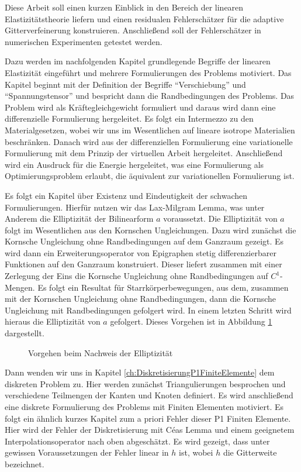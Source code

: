 \documentclass{scrartcl}
\begin{document}
Diese Arbeit soll einen kurzen Einblick in den Bereich der linearen Elastizitätstheorie liefern und einen residualen Fehlerschätzer für die adaptive Gitterverfeinerung konstruieren. Anschließend soll der Fehlerschätzer in numerischen Experimenten getestet werden.

Dazu werden im nachfolgenden Kapitel grundlegende Begriffe der linearen Elastizität eingeführt und mehrere Formulierungen des Problems motiviert. Das Kapitel beginnt mit der Definition der Begriffe "`Verschiebung"' und "`Spannungstensor"' und bespricht dann die Randbedingungen des Problems. Das Problem wird als Kräftegleichgewicht formuliert und daraus wird dann eine differenzielle Formulierung hergeleitet. Es folgt ein Intermezzo zu den Materialgesetzen, wobei wir uns im Wesentlichen auf lineare isotrope Materialien beschränken. Danach wird aus der differenziellen Formulierung eine variationelle Formulierung mit dem Prinzip der virtuellen Arbeit hergeleitet. Anschließend wird ein Ausdruck für die Energie hergeleitet, was eine Formulierung als Optimierungsproblem erlaubt, die äquivalent zur variationellen Formulierung ist.

Es folgt ein Kapitel über Existenz und Eindeutigkeit der schwachen Formulierungen. Hierfür nutzen wir das Lax-Milgram Lemma, was unter Anderem die Elliptizität der Bilinearform $a$ voraussetzt. Die Elliptizität von $a$ folgt im Wesentlichen aus den Kornschen Ungleichungen. Dazu wird zunächst die Kornsche Ungleichung ohne Randbedingungen auf dem Ganzraum gezeigt. Es wird dann ein Erweiterungsoperator von Epigraphen stetig differenzierbarer Funktionen auf den Ganzraum konstruiert. Dieser liefert zusammen mit einer Zerlegung der Eins die Kornsche Ungleichung ohne Randbedingungen auf $C^1$-Mengen. Es folgt ein Resultat für Starrkörperbewegungen, aus dem, zusammen mit der Kornschen Ungleichung ohne Randbedingungen, dann die Kornsche Ungleichung mit Randbedingungen gefolgert wird. In einem letzten Schritt wird hieraus die Elliptizität von $a$ gefolgert. Dieses Vorgehen ist in Abbildung \ref{dr:KornFlowchart} dargestellt.

\begin{figure}[h]
\centering
\vspace*{0.3cm}
\scalebox{0.7}{

}
\caption{Vorgehen beim Nachweis der Elliptizität}
\label{dr:KornFlowchart}
\end{figure}

Dann wenden wir uns in Kapitel \ref{ch:DiskretisierungP1FiniteElemente} dem diskreten Problem zu. Hier werden zunächst Triangulierungen besprochen und verschiedene Teilmengen der Kanten und Knoten definiert. Es wird anschließend eine diskrete Formulierung des Problems mit Finiten Elementen motiviert.
Es folgt ein ähnlich kurzes Kapitel zum a priori Fehler dieser P1 Finiten Elemente. Hier wird der Fehler der Diskretisierung mit Céas Lemma und einem geeignetem Interpolationsoperator nach oben abgeschätzt. Es wird gezeigt, dass unter gewissen Voraussetzungen der Fehler linear in $h$ ist, wobei $h$ die Gitterweite bezeichnet.
\end{document}
